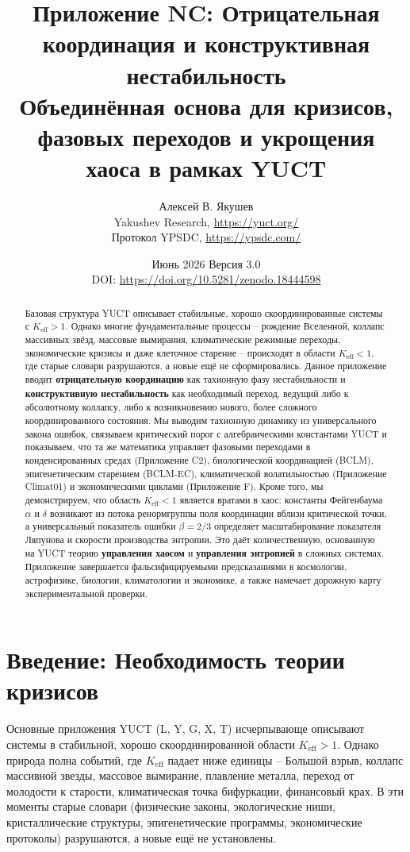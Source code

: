 \documentclass[12pt,a4paper]{article}
\title{\Huge\textbf{Приложение NC: Отрицательная координация и конструктивная нестабильность}\\[0.3cm]
	\large Объединённая основа для кризисов, фазовых переходов и укрощения хаоса в рамках YUCT}
\author{Алексей В. Якушев \\ 
	Yakushev Research, \url{https://yuct.org/} \\ 
	Протокол YPSDC, \url{https://ypsdc.com/}}
\date{Июнь 2026 \quad Версия 3.0 \\ \medskip
	DOI: \url{https://doi.org/10.5281/zenodo.18444598}}
\newcommand{\Keff}{K_{\mathrm{eff}}}
\begin{document}
	
	\maketitle
	
	\begin{abstract}
		Базовая структура YUCT описывает стабильные, хорошо скоординированные системы с $\Keff > 1$.
		Однако многие фундаментальные процессы – рождение Вселенной, коллапс массивных звёзд,
		массовые вымирания, климатические режимные переходы, экономические кризисы и даже клеточное старение –
		происходят в области $\Keff < 1$, где старые словари разрушаются, а новые ещё не сформировались.
		Данное приложение вводит \textbf{отрицательную координацию} как тахионную фазу нестабильности
		и \textbf{конструктивную нестабильность} как необходимый переход, ведущий либо к абсолютному коллапсу,
		либо к возникновению нового, более сложного координированного состояния.
		Мы выводим тахионную динамику из универсального закона ошибок, связываем критический порог с
		алгебраическими константами YUCT и показываем, что та же математика управляет фазовыми переходами
		в конденсированных средах (Приложение C2), биологической координацией (BCLM),
		эпигенетическим старением (BCLM‑EC), климатической волатильностью (Приложение Climat01)
		и экономическими циклами (Приложение F). Кроме того, мы демонстрируем, что область $\Keff < 1$
		является вратами в хаос: константы Фейгенбаума $\alpha$ и $\delta$ возникают из потока
		ренормгруппы поля координации вблизи критической точки, а универсальный показатель ошибки $\beta = 2/3$
		определяет масштабирование показателя Ляпунова и скорости производства энтропии.
		Это даёт количественную, основанную на YUCT теорию \textbf{управления хаосом} и
		\textbf{управления энтропией} в сложных системах. Приложение завершается фальсифицируемыми
		предсказаниями в космологии, астрофизике, биологии, климатологии и экономике, а также
		намечает дорожную карту экспериментальной проверки.
	\end{abstract}
	
	\tableofcontents
	\newpage
	
	\section{Введение: Необходимость теории кризисов}
	
	Основные приложения YUCT (L, Y, G, X, T) исчерпывающе описывают системы в стабильной,
	хорошо скоординированной области $\Keff > 1$. Однако природа полна событий, где $\Keff$
	падает ниже единицы – Большой взрыв, коллапс массивной звезды, массовое вымирание,
	плавление металла, переход от молодости к старости, климатическая точка бифуркации,
	финансовый крах. В эти моменты старые словари (физические законы, экологические ниши,
	кристаллические структуры, эпигенетические программы, экономические протоколы) разрушаются,
	а новые ещё не установлены.
	
\end{document}
